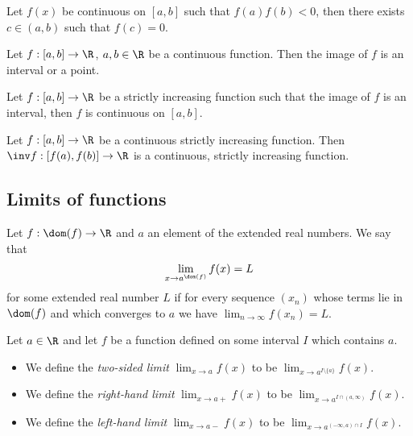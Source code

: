 \documentclass{article}
\begin{document}
\begin{theorem}
	Let $f(x)$ be continuous on $[a,b]$ such that $f(a)f(b)<0$,
	then there exists $c\in(a,b)$ such that $f(c)=0$.
\end{theorem}

\setcounter{theorem}{8}
\begin{theorem}
	Let $f:[a,b]\to\R$, $a,b\in\R$ be a continuous function. Then the
	image of $f$ is an interval or a point.
\end{theorem}

\begin{theorem}
	Let $f:[a,b]\to\R$ be a strictly increasing function such that
	the image of $f$ is an interval, then $f$ is continuous on $[a,b]$.
\end{theorem}

\begin{theorem}
	Let $f:[a,b]\to\R$ be a continuous strictly increasing function.
	Then $\inv f:[f(a),f(b)]\to\R$ is a continuous, strictly increasing
	function.
\end{theorem}

\subsection{Limits of functions}

\begin{definition}
	Let $f:\dom(f)\to\R$ and $a$ an element of the extended real numbers. We say
	that
	\begin{align*}
		\lim_{x\to a^{\dom(f)}}f(x)=L
	\end{align*}
	for some extended real number $L$ if
	for every sequence $(x_n)$ whose terms lie in $\dom(f)$ and which converges
	to $a$ we have $\lim_{n\to\infty}f(x_n)=L$.
\end{definition}

\begin{definition}
	Let $a\in\R$ and let $f$ be a function defined on some interval
	$I$ which contains $a$.
	\begin{itemize}
		\item We define the \emph{two-sided limit} $\lim_{x\to a}f(x)$ to be $\lim_{x\to a^{I\setminus\{a\}}}f(x)$.
		\item We define the \emph{right-hand limit} $\lim_{x\to a+}f(x)$ to be $\lim_{x\to a^{I\cap (a, \infty)}}f(x)$.
		\item We define the \emph{left-hand limit} $\lim_{x\to a-}f(x)$ to be $\lim_{x\to a^{(-\infty,a)\cap I}}f(x)$.
	\end{itemize}
\end{definition}
\end{document}
